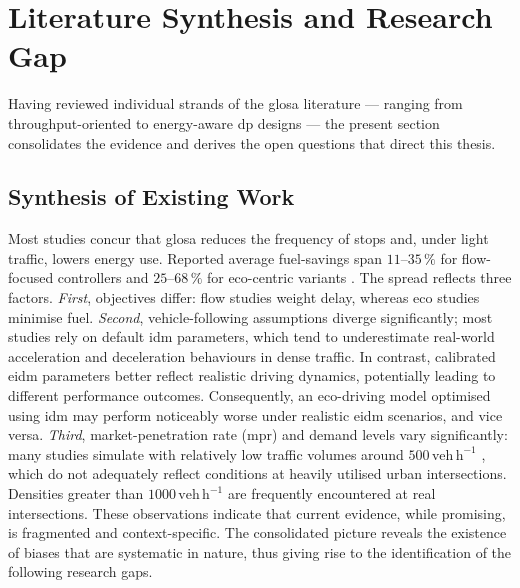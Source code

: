\section{Literature Synthesis and Research Gap}
\label{sec:research_gap}

Having reviewed individual strands of the \ac{glosa} literature --- ranging from throughput-oriented to energy-aware \ac{dp} designs --- the present section consolidates the evidence and derives the open questions that direct this thesis.

\subsection{Synthesis of Existing Work}
Most studies concur that \ac{glosa} reduces the frequency of stops and, under light traffic, lowers energy use. Reported average fuel-savings span \(11\text{–}35\,\%\) for flow-focused controllers \cite{Guo2019,Typaldos2023,Cai2008} and \(25\text{–}68\,\%\) for eco-centric variants \cite{Park2024,Pulvirenti2023,Dong2024}. The spread reflects three factors. \emph{First}, objectives differ: flow studies weight delay, whereas eco studies minimise fuel. \emph{Second}, vehicle-following assumptions diverge significantly; most studies rely on default \ac{idm} parameters, which tend to underestimate real-world acceleration and deceleration behaviours in dense traffic. In contrast, calibrated \ac{eidm} parameters better reflect realistic driving dynamics, potentially leading to different performance outcomes. Consequently, an eco-driving model optimised using \ac{idm} may perform noticeably worse under realistic \ac{eidm} scenarios, and vice versa. \emph{Third}, market-penetration rate (\ac{mpr}) and demand levels vary significantly: many studies simulate with relatively low traffic volumes around \(500\,\mathrm{veh\,h^{-1}}\) \cite{Yang2017,Ala2016}, which do not adequately reflect conditions at heavily utilised urban intersections. Densities greater than \(1000\,\mathrm{veh\,h^{-1}}\) are frequently encountered at real intersections. These observations indicate that current evidence, while promising, is fragmented and context-specific.
\mynewline
The consolidated picture reveals the existence of biases that are systematic in nature, thus giving rise to the identification of the following research gaps.

